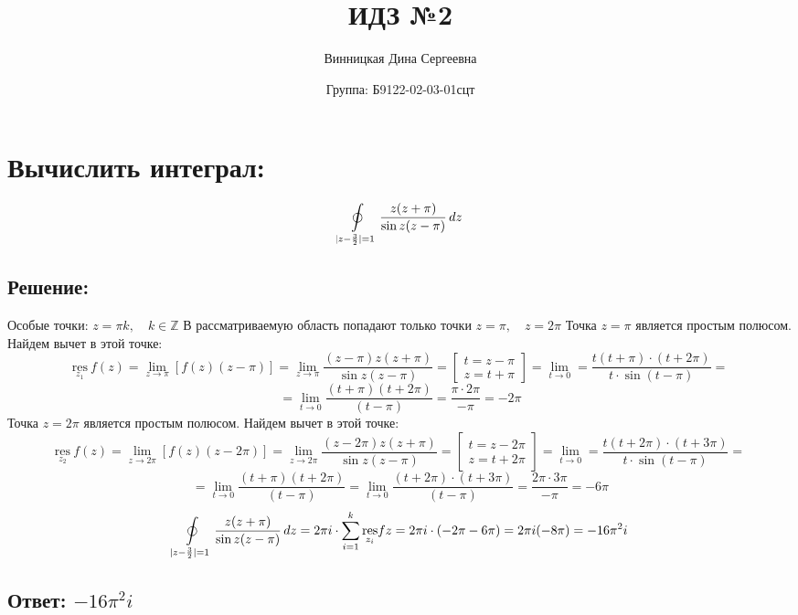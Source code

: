 \documentclass{article}
\title{\vspace{-1cm}ИДЗ №2}
\author{Винницкая Дина Сергеевна}
\date{Группа: Б9122-02-03-01сцт}
\begin{document}
	
	\maketitle

	\section{Вычислить интеграл:} \[
        \ointop_{|z - \frac{3}{2}| = 1} \frac{z(z + \pi)}{\sin{z}(z - \pi)}\, dz
        \]
	\subsection{Решение:}
        Особые точки: $z = \pi k, \quad k \in \mathbb{Z}$
        В рассматриваемую область попадают только точки $z = \pi, \quad z = 2\pi$
        Точка $z = \pi$ является простым полюсом. Найдем вычет в этой точке:
        $$\underset{z_1}{\text{res}}\ f(z) = \lim\limits_{z\rightarrow \pi} \left[f(z) (z - \pi) \right] = \lim\limits_{z\rightarrow \pi} \frac{(z - \pi)z(z + \pi)}{\sin{z}(z - \pi)} = \left[\begin{array}{cc}
             t = z - \pi\\
             z = t + \pi  
        \end{array} \right] =  \lim\limits_{t\rightarrow 0} = \frac{t(t + \pi) \cdot (t +2\pi)}{t \cdot \sin(t- \pi)} = $$
        $$=  \lim\limits_{t\rightarrow 0} \frac{(t + \pi)(t + 2\pi)}{(t - \pi)} = \frac{\pi \cdot 2\pi}{-\pi} = -2\pi $$
         Точка $z = 2\pi$ является простым полюсом. Найдем вычет в этой точке:
        $$\underset{z_2}{\text{res}}\ f(z) = \lim\limits_{z\rightarrow 2\pi} \left[f(z) (z - 2\pi) \right] = \lim\limits_{z\rightarrow 2\pi} \frac{(z - 2\pi)z(z + \pi)}{\sin{z}(z - \pi)} = \left[\begin{array}{cc}
             t = z - 2\pi\\
             z = t + 2\pi  
        \end{array} \right] =  \lim\limits_{t\rightarrow 0} = \frac{t(t + 2\pi) \cdot (t +3\pi)}{t \cdot \sin(t- \pi)} = $$
        $$=  \lim\limits_{t\rightarrow 0} \frac{(t + \pi)(t + 2\pi)}{(t - \pi)} =  \lim\limits_{t\rightarrow 0} \frac{(t + 2\pi)\cdot (t + 3\pi)}{(t - \pi)} = \frac{2\pi \cdot 3\pi}{-\pi} = -6\pi$$
         \[
        \ointop_{|z - \frac{3}{2}| = 1} \frac{z(z + \pi)}{\sin{z}(z - \pi)}\, dz = 2\pi i \cdot \sum\limits_{i = 1}^{k} \underset{z_i}{\text{res}} f{z} = 2\pi i \cdot (-2\pi - 6\pi) = 2\pi i (-8\pi) = -16\pi^2 i
        \]
	\subsection{Ответ: $-16\pi^2 i$}
\end{document}

